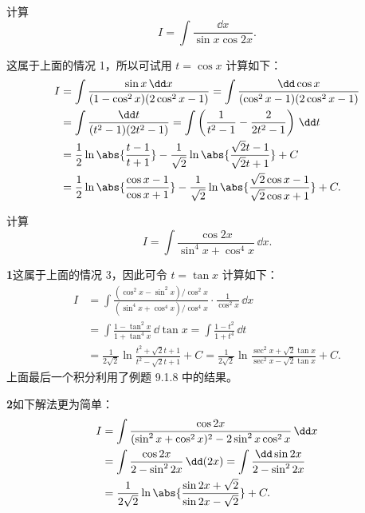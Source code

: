 \begin{xexample}[9.2.4]
计算
\[
  I=\int\frac{\dd x}{\sin x\cos2x}.
\]
\end{xexample}

\begin{xsolution}
这属于上面的情况 1，所以可试用 $t=\cos x$ 计算如下：
\begin{align*}
  I
  &=\int\frac{\sin x\,\dd x}{(1-\cos^2x)(2\cos^2x-1)}
   =\int\frac{\dd\cos x}{(\cos^2x-1)(2\cos^2x-1)}\\
  &=\int\frac{\dd t}{(t^2-1)(2t^2-1)}
   =\int\left(\frac1{t^2-1}-\frac2{2t^2-1}\right)\,\dd t\\
  &=\frac12\ln\abs{\frac{t-1}{t+1}}
   -\frac1{\sqrt2}\ln\abs{\frac{\sqrt2t-1}{\sqrt2t+1}}+C\\
  &=\frac12\ln\abs{\frac{\cos x-1}{\cos x+1}}
   -\frac1{\sqrt2}\ln\abs{\frac{\sqrt2\cos x-1}{\sqrt2\cos x+1}}+C.
\end{align*}
\end{xsolution}

\begin{xexample}[9.2.5]
计算
\[
  I=\int\frac{\cos2x}{\sin^4x+\cos^4x}\,\dd x.
\]
\end{xexample}

\begin{xsolution}
\textbf{1}\quad 这属于上面的情况 3，因此可令 $t=\tan x$ 计算如下：
\begin{align*}
  I
  &=\int\frac{(\cos^2x-\sin^2x)/\cos^2x}{(\sin^4x+\cos^4x)/\cos^4x}\cdot\frac1{\cos^2x}\,\dd x\\
  &=\int\frac{1-\tan^2x}{1+\tan^4x}\,\dd\tan x
   =\int\frac{1-t^2}{1+t^4}\,\dd t\\
  &=\frac1{2\sqrt2}\ln\frac{t^2+\sqrt2t+1}{t^2-\sqrt2t+1}+C
   =\frac1{2\sqrt2}\ln\frac{\sec^2x+\sqrt2\tan x}{\sec^2x-\sqrt2\tan x}+C.
\end{align*}
上面最后一个积分利用了例题 9.1.8 中的结果。
\end{xsolution}

\begin{xsolution}
\textbf{2}\quad 如下解法更为简单：
\begin{align*}
  I
  &=\int\frac{\cos2x}{(\sin^2x+\cos^2x)^2-2\sin^2x\cos^2x}\,\dd x\\
  &=\int\frac{\cos2x}{2-\sin^22x}\,\dd(2x)
   =\int\frac{\dd\sin2x}{2-\sin^22x}\\
  &=\frac1{2\sqrt2}\ln\abs{\frac{\sin2x+\sqrt2}{\sin2x-\sqrt2}}+C.
\end{align*}
\end{xsolution}

